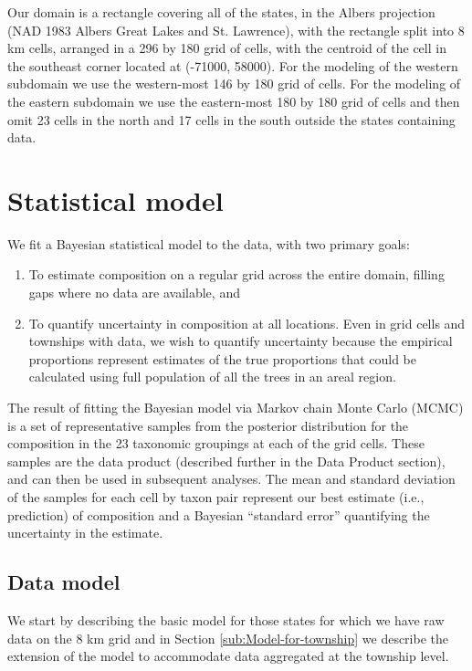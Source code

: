 \documentclass[12pt]{article}\usepackage[]{graphicx}\usepackage[]{color}
\begin{document}
Our domain is a rectangle covering all of the states, in the Albers
projection (NAD 1983 Albers Great Lakes and St. Lawrence), with the
rectangle split into 8 km cells, arranged in a 296 by 180 grid of
cells, with the centroid of the cell in the southeast corner located
at (-71000, 58000). For the modeling of the western subdomain we use
the western-most 146 by 180 grid of cells. For the modeling of the
eastern subdomain we use the eastern-most 180 by 180 grid of cells
and then omit 23 cells in the north and 17 cells in the south outside
the states containing data.


\section{Statistical model}

We fit a Bayesian statistical model to the data, with two primary
goals:
\begin{enumerate}
\item To estimate composition on a regular grid across the entire domain,
filling gaps where no data are available, and
\item To quantify uncertainty in composition at all locations. Even in grid
cells and townships with data, we wish to quantify uncertainty because
the empirical proportions represent estimates of the true proportions
that could be calculated using full population of all the trees in
an areal region.
\end{enumerate}
The result of fitting the Bayesian model via Markov chain Monte Carlo
(MCMC) is a set of representative samples from the posterior distribution
for the composition in the 23 taxonomic groupings at each of the grid
cells. These samples are the data product (described further in the
Data Product section), and can then be used in subsequent analyses.
The mean and standard deviation of the samples for each cell by taxon
pair represent our best estimate (i.e., prediction) of composition
and a Bayesian ``standard error'' quantifying the uncertainty in
the estimate. 


\subsection{Data model}

We start by describing the basic model for those states for which
we have raw data on the 8 km grid and in Section \ref{sub:Model-for-township}
we describe the extension of the model to accommodate data aggregated
at the township level.
\end{document}
